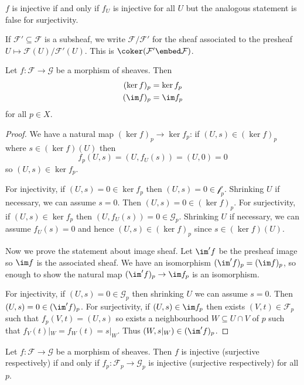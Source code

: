 \documentclass[a4paper]{article}
\newcommand{\sh}[1]{\mathcal{#1}} %
\begin{document}
\(f\) is injective if and only if \(f_U\) is injective for all \(U\) but the analogous statement is false for surjectivity.

If \(\sh F' \subseteq \sh F\) is a subsheaf, we write \(\sh F/\sh F'\) for the sheaf associated to the presheaf \(U \mapsto \sh F(U)/\sh F'(U)\). This is \(\coker (\sh F' \embed \sh F)\).

\begin{lemma}
  Let \(f: \sh F \to \sh G\) be a morphism of sheaves. Then
  \begin{align*}
    (\ker f)_p &= \ker f_p \\
    (\im f)_p &= \im f_p
  \end{align*}
  for all \(p \in X\).
\end{lemma}

\begin{proof}
  We have a natural map \((\ker f)_p \to \ker f_p\): if \((U, s) \in (\ker f)_p\) where \(s \in (\ker f)(U)\) then
  \[
    f_p(U, s) = (U, f_U(s)) = (U, 0) = 0
  \]
  so \((U, s) \in \ker f_p\).

  For injectivity, if \((U, s) = 0 \in \ker f_p\) then \((U, s) = 0 \in \sh f_p\). Shrinking \(U\) if necessary, we can assume \(s = 0\). Then \((U, s) = 0 \in (\ker f)_p\). For surjectivity, if \((U, s) \in \ker f_p\) then \((U, f_U(s)) = 0 \in \sh G_p\). Shrinking \(U\) if necessary, we can assume \(f_U(s) = 0\) and hence \((U, s) \in (\ker f)_p\) since \(s \in (\ker f)(U)\).

  Now we prove the statement about image sheaf. Let \(\im' f\) be the presheaf image so \(\im f\) is the associated sheaf. We have an isomorphism \((\im ' f)_p = (\im f)_p\), so enough to show the natural map \((\im' f)_p \to \im f_p\) is an isomorphism.

  For injectivity, if \((U, s) = 0 \in \sh G_p\) then shrinking \(U\) we can assume \(s = 0\). Then \((U, s) = 0 \in (\im' f)_p\). For surjectivity, if \((U, s) \in \im f_p\) then exists \((V, t) \in \sh F_p\) such that \(f_p(V, t) = (U, s)\) so exists a neighbourhood \(W \subseteq U \cap V\) of \(p\) such that \(f_V(t)|_W = f_W(t) = s|_W\). Thus \((W, s|_W) \in (\im' f)_p\).
\end{proof}

\begin{proposition}
  Let \(f: \sh F \to \sh G\) be a morphism of sheaves. Then \(f\) is injective (surjective respectively) if and only if \(f_p: \sh F_p \to \sh G_p\) is injective (surjective respectively) for all \(p\).
\end{proposition}
\end{document}
